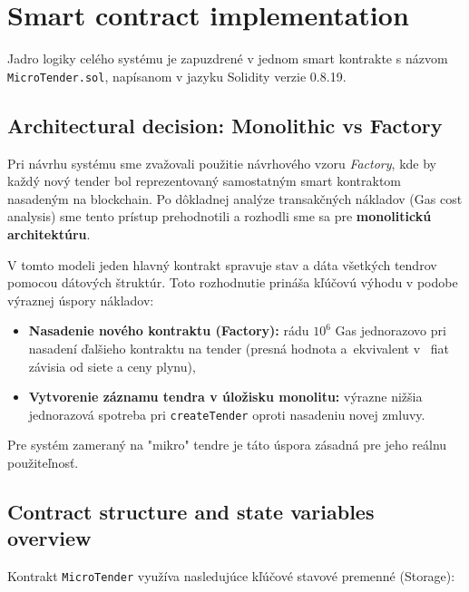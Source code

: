 \section{Smart contract implementation}

Jadro logiky celého systému je zapuzdrené v jednom smart kontrakte s názvom \texttt{MicroTender.sol}, napísanom v jazyku Solidity verzie 0.8.19.

\subsection{Architectural decision: Monolithic vs Factory}

Pri návrhu systému sme zvažovali použitie návrhového vzoru \textit{Factory}, kde by každý nový tender bol reprezentovaný samostatným smart kontraktom nasadeným na blockchain. Po dôkladnej analýze transakčných nákladov (Gas cost analysis) sme tento prístup prehodnotili a rozhodli sme sa pre \textbf{monolitickú architektúru}.

V tomto modeli jeden hlavný kontrakt spravuje stav a dáta všetkých tendrov pomocou dátových štruktúr. Toto rozhodnutie prináša kľúčovú výhodu v podobe výraznej úspory nákladov:
\begin{itemize}
    \item \textbf{Nasadenie nového kontraktu (Factory):} rádu $10^6$ Gas jednorazovo pri nasadení ďalšieho kontraktu na tender (presná hodnota a~ekvivalent v~ fiat závisia od siete a ceny plynu),
    \item \textbf{Vytvorenie záznamu tendra v úložisku monolitu:} výrazne nižšia jednorazová spotreba pri \texttt{createTender} oproti nasadeniu novej zmluvy.
\end{itemize}
Pre systém zameraný na "mikro" tendre je táto úspora zásadná pre jeho reálnu použiteľnosť.

\subsection{Contract structure and state variables overview}

Kontrakt \texttt{MicroTender} využíva nasledujúce kľúčové stavové premenné (Storage):

